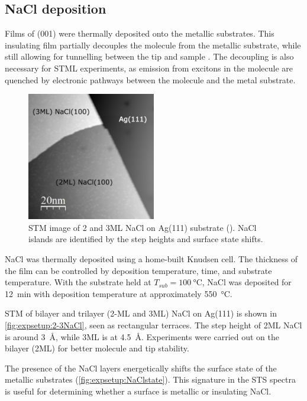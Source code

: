 \subsection*{NaCl deposition}

Films of (001) were thermally deposited onto the metallic substrates. This insulating film partially decouples the molecule from the metallic substrate, while still allowing for tunnelling between the tip and sample \citep{repp2005molecules}. The decoupling is also necessary for \ac{STML} experiments, as emission from excitons in the molecule are quenched by electronic pathways between the molecule and the metal substrate.

\begin{figure} [H]
    \centering
    \includegraphics[width=0.5\textwidth]{pictures/nacl_example.png}
    \caption{STM image of 2 and 3ML NaCl on Ag(111) substrate (). NaCl islands are identified by the step heights and surface state shifts. }
    \label{fig:expsetup:2-3NaCl}
\end{figure}

NaCl was thermally deposited using a home-built Knudsen cell. The thickness of the film can be controlled by deposition temperature, time, and substrate temperature. With the substrate held at $T_{sub} = \SI{100}{\celsius}$, NaCl was deposited for \SI{12}{\minute} with deposition temperature at approximately \SI{550}{\celsius}. 

\ac{STM} of bilayer and trilayer (2-\acf{ML} and 3\ac{ML}) NaCl on Ag(111) is shown in \autoref{fig:expsetup:2-3NaCl}, seen as rectangular terraces. The step height of 2\ac{ML} NaCl is around \SI{3}{\angstrom}, while 3\ac{ML} is at \SI{4.5}{\angstrom}. Experiments were carried out on the bilayer (2\ac{ML}) for better molecule and tip stability.

The presence of the NaCl layers energetically shifts the surface state of the metallic substrates (\autoref{fig:expsetup:NaClstate}). This signature in the \ac{STS} spectra is useful for determining whether a surface is metallic or insulating NaCl.

